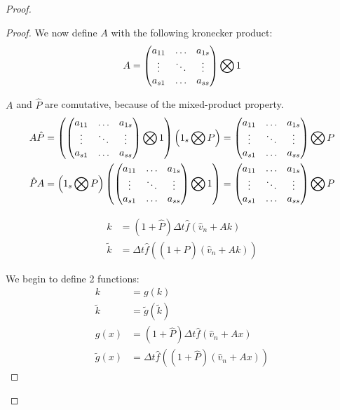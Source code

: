 \begin{proof}
\begin{proof}
We now define $A$ with the following kronecker product:
\begin{equation}
 A=\begin{pmatrix}
    a_{11}	&\ldots	&a_{1s}\\
    \vdots	&\ddots	&\vdots\\
    a_{s1}	&\ldots	&a_{ss}\\
   \end{pmatrix} \bigotimes 1
\end{equation}

$A$ and $\hat{P}$ are comutative, because of the mixed-product property.
\begin{align}
A\hat{P}&=\left(\begin{pmatrix}
    a_{11}	&\ldots	&a_{1s}\\
    \vdots	&\ddots	&\vdots\\
    a_{s1}	&\ldots	&a_{ss}\\
   \end{pmatrix} \bigotimes 1 \right)
   \left(1_{s}\bigotimes P\right)=
         \begin{pmatrix}
    a_{11}	&\ldots	&a_{1s}\\
    \vdots	&\ddots	&\vdots\\
    a_{s1}	&\ldots	&a_{ss}\\
    \end{pmatrix}\bigotimes P\\
    \hat{P}A&=
   \left(1_{s}\bigotimes P\right)
         \left(\begin{pmatrix}
    a_{11}	&\ldots	&a_{1s}\\
    \vdots	&\ddots	&\vdots\\
    a_{s1}	&\ldots	&a_{ss}\\
   \end{pmatrix} \bigotimes 1 \right)=
         \begin{pmatrix}
    a_{11}	&\ldots	&a_{1s}\\
    \vdots	&\ddots	&\vdots\\
    a_{s1}	&\ldots	&a_{ss}\\
    \end{pmatrix}\bigotimes P
\end{align}

\begin{align}
 k&=(1+\hat{P})\Delta t\hat{f}(\hat{v}_{n}+Ak)\\
 \tilde{k}&=\Delta t \hat{f}((1+\hat{P})(\hat{v}_{n}+Ak))
\end{align}

We begin to define 2 functions:
\begin{align}
 k&=g(k)\\
 \tilde{k}&=\tilde{g}(\tilde{k})\\
 g(x)&=(1+\hat{P})\Delta t \hat{f}(\hat{v}_{n}+Ax)\\
 \tilde{g}(x)&=\Delta t \hat{f}((1+\hat{P})(\hat{v}_{n}+Ax))
\end{align}


\end{proof}
\end{proof}
